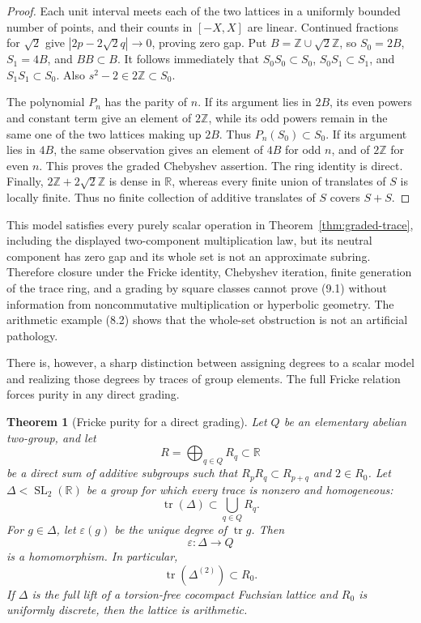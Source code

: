 \documentclass[11pt,reqno]{amsart}
\newtheorem{theorem}{Theorem}[section]
\theoremstyle{definition}
\theoremstyle{remark}
\newcommand{\R}{\mathbb R}
\newcommand{\Z}{\mathbb Z}
\newcommand{\Tr}{\operatorname{tr}}
\newcommand{\SL}{\operatorname{SL}}
\begin{document}
\begin{proof}
Each unit interval meets each of the two lattices in a uniformly bounded
number of points, and their counts in \([-X,X]\) are linear.  Continued
fractions for \(\sqrt2\) give \(|2p-2\sqrt2q|\to0\), proving zero gap.  Put
\(B=\Z\cup\sqrt2\Z\), so \(S_0=2B\), \(S_1=4B\), and \(BB\subset B\).
It follows immediately that
\(S_0S_0\subset S_0\), \(S_0S_1\subset S_1\), and
\(S_1S_1\subset S_0\).  Also \(s^2-2\in2\Z\subset S_0\).

The polynomial \(P_n\) has the parity of \(n\).  If its argument lies in \(2B\), its
even powers and constant term give an element of \(2\Z\), while its odd powers
remain in the same one of the two lattices making up \(2B\).  Thus
\(P_n(S_0)\subset S_0\).  If its argument lies in \(4B\), the same observation gives an
element of \(4B\) for odd \(n\), and of \(2\Z\) for even \(n\).  This proves
the graded Chebyshev assertion.  The ring identity is direct.  Finally,
\(2\Z+2\sqrt2\Z\) is dense in \(\R\),
whereas every finite union of translates of \(S\) is locally finite.  Thus
no finite collection of additive translates of \(S\) covers \(S+S\).
\end{proof}

This model satisfies every purely scalar operation in
Theorem~\ref{thm:graded-trace}, including the displayed two-component
multiplication law, but its neutral component has zero gap and its whole set is not an
approximate subring.  Therefore closure under the Fricke identity,
Chebyshev iteration, finite
generation of the trace ring, and a grading by square classes cannot prove
(9.1) without information from noncommutative multiplication or hyperbolic
geometry.  The arithmetic example (8.2)
shows that the whole-set obstruction is not an artificial pathology.

There is, however, a sharp distinction between assigning degrees to a scalar
model and realizing those degrees by traces of group elements.  The full
Fricke relation forces purity in any direct grading.

\begin{theorem}[Fricke purity for a direct grading]
\label{thm:fricke-purity}
Let \(Q\) be an elementary abelian two-group, and let
\[
 R=\bigoplus_{q\in Q}R_q\subset\R
\]
be a direct sum of additive subgroups such that
\(R_pR_q\subset R_{p+q}\) and \(2\in R_0\).  Let
\(\Delta<\SL_2(\R)\) be a group for which every trace is nonzero and
homogeneous:
\[
 \Tr(\Delta)\subset\bigcup_{q\in Q}R_q.
\]
For \(g\in\Delta\), let \(\varepsilon(g)\) be the unique degree of
\(\Tr g\).  Then
\[
 \varepsilon:\Delta\longrightarrow Q
\]
is a homomorphism.  In particular,
\[
 \Tr(\Delta^{(2)})\subset R_0.
\tag{10.7}
\]
If \(\Delta\) is the full lift of a torsion-free cocompact Fuchsian lattice
and \(R_0\) is uniformly discrete, then the lattice is arithmetic.
\end{theorem}
\end{document}
